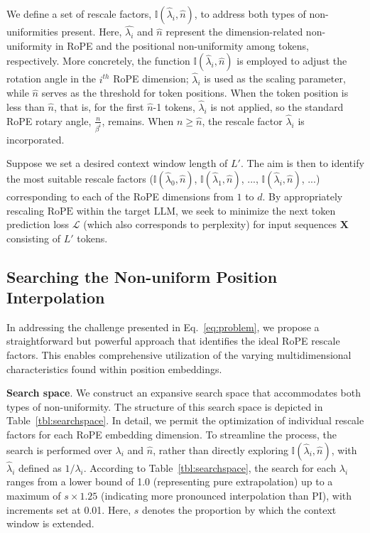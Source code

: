 We define a set of rescale factors, $\mathbb{I}(\hat{\lambda}_{i},\hat{n})$, to address both types of non-uniformities present. Here, $\hat{\lambda_i}$ and $\hat{n}$ represent the dimension-related non-uniformity in RoPE and the positional non-uniformity among tokens, respectively. More concretely, the function $\mathbb{I}(\hat{\lambda}_{i},\hat{n})$ is employed to adjust the rotation angle in the $i^{th}$ RoPE dimension; $\hat\lambda_{i}$ is used as the scaling parameter, while $\hat{n}$ serves as the threshold for token positions. When the token position is less than $\hat{n}$, that is, for the first $\hat{n}$-1 tokens, $\hat\lambda_{i}$ is not applied, so the standard RoPE rotary angle, $\frac{n}{\beta^i}$, remains. When $n\ge\hat{n}$, the rescale factor $\hat\lambda_{i}$ is incorporated.

Suppose we set a desired context window length of $L'$. The aim is then to identify the most suitable rescale factors ($\mathbb{I}(\hat{\lambda}_{0},\hat{n})$, $\mathbb{I}(\hat{\lambda}_{1},\hat{n})$, ..., $\mathbb{I}(\hat{\lambda}_{i},\hat{n})$, ...) corresponding to each of the RoPE dimensions from $1$ to $d$. By appropriately rescaling $\text{RoPE}$ within the target $\text{LLM}$, we seek to minimize the next token prediction loss $\mathcal{L}$ (which also corresponds to perplexity) for input sequences $\mathbf{X}$ consisting of $L'$ tokens.

\subsection{Searching the Non-uniform Position Interpolation}

In addressing the challenge presented in Eq.~\ref{eq:problem}, we propose a straightforward but powerful approach that identifies the ideal RoPE rescale factors. This enables comprehensive utilization of the varying multidimensional characteristics found within position embeddings.

\textbf{Search space}. We construct an expansive search space that accommodates both types of non-uniformity. The structure of this search space is depicted in Table~\ref{tbl:searchspace}. In detail, we permit the optimization of individual rescale factors for each RoPE embedding dimension. To streamline the process, the search is performed over $\lambda_i$ and $\hat{n}$, rather than directly exploring $\mathbb{I}(\hat{\lambda}_{i},\hat{n})$, with $\hat{\lambda}_{i}$ defined as $1/\lambda_i$. According to Table~\ref{tbl:searchspace}, the search for each $\lambda_i$ ranges from a lower bound of 1.0 (representing pure extrapolation) up to a maximum of $s\times1.25$ (indicating more pronounced interpolation than PI), with increments set at 0.01. Here, $s$ denotes the proportion by which the context window is extended.

